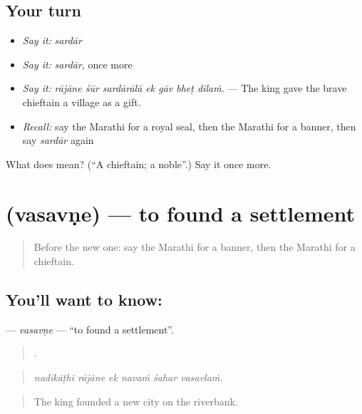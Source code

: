 \subsection*{Your turn}
\begin{itemize}
\raggedright
  \item \emph{Say it:} \emph{sardār}
  \item \emph{Say it:} \emph{sardār}, once more
  \item \emph{Say it:} \emph{rājāne śūr sardārālā ek gāv bheṭ dilaṁ.} — The king gave the brave chieftain a village as a gift.
  \item \emph{Recall:} say the Marathi for a royal seal, then the Marathi for a banner, then say \emph{sardār} again
\end{itemize}

\begin{tcolorbox}[breakable,colback=teal!4,colframe=teal!35!black,title={Before you move on}]
What does  mean? (\textquotedblleft{}A chieftain; a noble\textquotedblright{}.) Say it once more.
\end{tcolorbox}
\section[\texorpdfstring{\mr{वसवणे} (vasavṇe)}{वसवणे (vasavṇe)}]{ (vasavṇe) — to found a settlement}

\label{lesson:MR-C327-vasavne}



\begin{quote}
Before the new one: say the Marathi for a banner, then the Marathi for a chieftain.
\end{quote}

\subsection*{You'll want to know: }
\textbf{} — \emph{vasavṇe} — \textquotedblleft{}to found a settlement\textquotedblright{}.

\begin{quote}
     .
\end{quote}

\begin{quote}
\emph{nadīkāṭhī rājāne ek navaṁ śahar vasavlaṁ.}
\end{quote}

\begin{quote}
The king founded a new city on the riverbank.
\end{quote}

